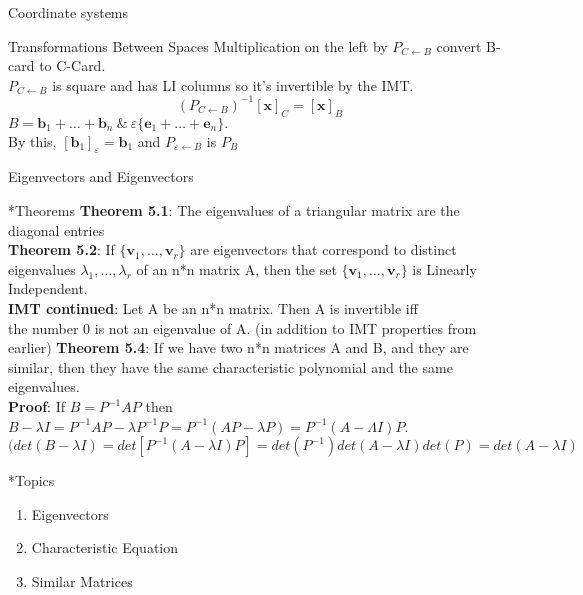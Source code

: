 \documentclass[a4paper, 12pt]{article}
\begin{document}
\begin{section}{Coordinate systems}
\begin{subsection}{Transformations Between Spaces}
Multiplication on the left by $P_{C\gets B}$ convert B-card to C-Card.\\
$P_{C\gets B}$ is square and has LI columns so it's invertible by the IMT.\\ 
\begin{equation}
	(P_{C \gets B})^{-1}[\textbf{x}]_{C}=[\textbf{x}]_{B}
\end{equation}
$B=\textbf{b}_{1}+\dots+\textbf{b}_{n} ~\& ~ \varepsilon \{\textbf{e}_{1}+\dots
+\textbf{e}_{n}\}.$ \\
By this, $[\textbf{b}_{1}]_{\varepsilon}=\textbf{b}_{1}$ and
$P_{\varepsilon \gets B}$ is $P_{B}$
\end{subsection}
\end{section}
\newpage
\begin{section}{Eigenvectors and Eigenvectors}
\begin{subsection}*{Theorems}
\textbf{Theorem 5.1}: The eigenvalues of a triangular matrix are the diagonal entries
\\ \noindent \textbf{Theorem 5.2}: If $\{ \textbf{v}_{1},\dots,\textbf{v}_{r}\}$ are 
eigenvectors that correspond to distinct eigenvalues $\lambda_{1},\dots, \lambda_{r}$
of an n*n matrix A, then the set $\{ \textbf{v}_{1},\dots,\textbf{v}_{r}\}$ is
Linearly Independent.\\
\noindent \textbf{IMT continued}: Let A be an n*n matrix. Then A is invertible iff \\
the number 0 is not an eigenvalue of A. (in addition to IMT properties from earlier)
\noindent \textbf{Theorem 5.4}: If we have two n*n matrices A and B, and they are
 similar, then they have the same characteristic polynomial and the same eigenvalues.
\\ \textbf{Proof}: If $B=P^{-1}AP$ then $B-\lambda I = P^{-1}AP-\lambda 
P^{-1}P=P^{-1}(AP-\lambda P)=P^{-1}(A-\Lambda I)P$. \\
\begin{equation}
(det(B-\lambda I)=det[P^{-1}(A-\lambda I)P]=det(P^{-1})det(A-\lambda I)det(P)=
det(A-\lambda I)
\end{equation}
\end{subsection}
\begin{subsection}*{Topics}
\begin{enumerate}
\item{Eigenvectors}
\item{Characteristic Equation}
\item{Similar Matrices}

\end{enumerate}
\end{subsection}
\end{section}
\end{document}
